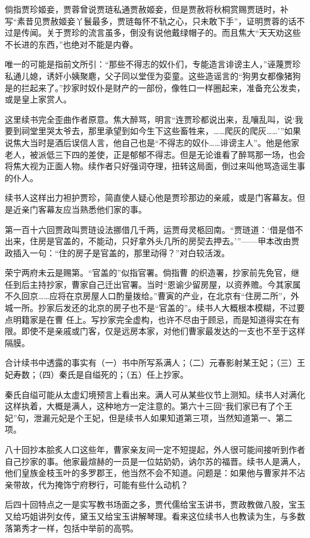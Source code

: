 \par 倘指贾珍姬妾，贾蓉曾说贾琏私通贾赦姬妾，但是贾赦将秋桐赏赐贾琏时，补写“素昔见贾赦姬妾丫鬟最多，贾琏每怀不轨之心，只未敢下手”，证明贾蓉的话不过是传闻。关于贾珍的流言虽多，倒没有说他戴绿帽子的。而且焦大“天天劝这些不长进的东西，”也绝对不能是内眷。
\par 唯一的可能是指前文所引：“那些不得志的奴仆们，专能造言诽谤主人，”诬蔑贾珍私通儿媳，诱奸小姨聚麀，父子同以堂侄为娈童。这些造谣言的“狗男女都像猪狗是的拦起来了。”抄家时奴仆是财产的一部份，像牲口一样圈起来，准备充公发卖，或是皇上家赏人。
\par 这里续书完全歪曲作者原意。焦大醉骂，明言“连贾珍都说出来，乱嚷乱叫，说‘我要到祠堂里哭太爷去，那里承望到如今生下这些畜牲来，……爬灰的爬灰……'”如果说焦大当时是酒后误信人言，他自己也是“不得志的奴仆……诽谤主人”。他是他家老人，被派低三下四的差使，正是郁郁不得志。但是无论谁看了醉骂那一场，也会将焦大视为正面人物。续作者只好强词夺理，扭转这局面，倒过来叫他骂造谣生事的仆人。
\par 续书人这样出力袒护贾珍，简直使人疑心他是贾珍那边的亲戚，或是门客幕友。但是近亲门客幕友应当熟悉他们家的事。
\par 第一百十六回贾政叫贾琏设法挪借几千两，运贾母灵柩回南。“贾琏道：‘借是借不出来，住房是官盖的，不能动，只好拿外头几所的房契去押去。'”——甲本改由贾政插入一句：“住的房子是官盖的，那里动得？”对白较活泼。
\par 荣宁两府未云是赐第。“官盖的”似指官署。倘指曹 的织造署，抄家前先免官，继任到后主持抄家，曹家自己迁出官署。当时“恩谕少留房屋，以资养赡。今其家属不久回京……应将在京房屋人口酌量拨给。”曹寅的产业，在北京有“住房二所”，外城一所。抄家后发还的北京的房子也不是“官盖的”。续书人大概根本模糊，不过要点明籍家是在曹 任上。写抄家完全虚构，也许不尽由于顾忌，而是知道得实在有限。即使不是亲戚或门客，仅是远房本家，对他们曹家最发达的一支也不至于这样隔膜。
\par 合计续书中透露的事实有（一）书中所写系满人；（二）元春影射某王妃；（三）王妃寿数；（四）秦氏是自缢死的；（五）任上抄家。
\par 秦氏自缢可能从太虚幻境预言上看出来。满人可从某些仪节上测知。续书人对满化这样执着，大概是满人，这种地方一定注意的。第六十三回“我们家已有了个王妃”句，泄漏元妃是个王妃，但是续书人如果知道第三项，当然知道第一、第二项。
\par 八十回抄本脍炙人口这些年，曹家亲友间一定不短提起，外人很可能间接听到作者自己抄家的事。他家最煊赫的一员是一位姑奶奶，讷尔苏的福晋。续书人是满人，他们皇族金枝玉叶的多罗郡王，他当然不会不知道。问题是：如果他与曹家并不沾亲带故，代为掩饰宁府秽行，可能有些什么动机？
\par 后四十回特点之一是实写教书场面之多，贾代儒给宝玉讲书，贾政教做八股，宝玉又给巧姐讲列女传，黛玉又给宝玉讲解琴理。看来这位续书人也教读为生，与多数落第秀才一样，包括中举前的高鹗。
